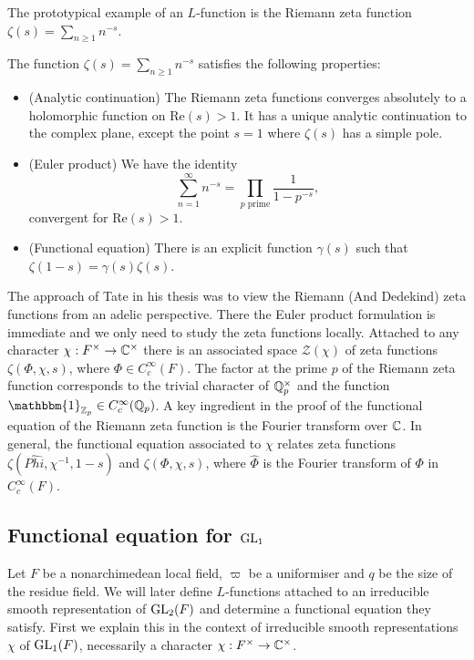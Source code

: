 The prototypical example of an $L$-function is the Riemann zeta function $\zeta(s) = \sum_{n \geq 1} n^{-s}$.

\begin{prop}
    The function $\zeta(s) = \sum_{n \geq 1} n^{-s}$ satisfies the following properties:
    \begin{itemize}
        \item (Analytic continuation) The Riemann zeta functions converges absolutely to a holomorphic function on $\mathrm{Re}(s)>1$. It has a unique analytic continuation to the complex plane, except the point $s=1$ where $\zeta(s)$ has a simple pole.
        \item (Euler product) We have the identity $$\sum\limits_{n=1}^\infty n^{-s} = \prod\limits_{p \text{ prime}} \frac{1}{1-p^{-s}},$$ convergent for $\mathrm{Re}(s)>1$.
        \item (Functional equation) There is an explicit function $\gamma(s)$ such that $\zeta(1-s)=\gamma(s)\zeta(s)$.
    \end{itemize}
\end{prop}

The approach of Tate in his thesis was to view the Riemann (And Dedekind) zeta functions from an adelic perspective. There the Euler product formulation is immediate and we only need to study the zeta functions locally. Attached to any character $\chi:F^\times \to \mathbb{C}^\times$ there is an associated space $\mathcal Z(\chi)$ of zeta functions $\zeta(\Phi,\chi,s)$, where $\Phi \in C_c^\infty(F)$. The factor at the prime $p$ of the Riemann zeta function corresponds to the trivial character of $\mathbb{Q}_p^\times$ and the function $\mathbbm{1}_{\ZZ_p} \in C_c^\infty(\QQ_p)$. A key ingredient in the proof of the functional equation of the Riemann zeta function is the Fourier transform over $\mathbb{C}$. In general, the functional equation associated to $\chi$ relates zeta functions $\zeta(\hat{Phi},\chi^{-1},1-s)$ and $\zeta(\Phi,\chi,s)$, where $\hat{\Phi}$ is the Fourier transform of $\Phi$ in $C_c^\infty(F)$. 







\subsection{Functional equation for \texorpdfstring{$\mathrm{GL}_1$}{TEXT}}

Let $F$ be a nonarchimedean local field, $\varpi$ be a uniformiser and $q$ be the size of the residue field. We will later define $L$-functions attached to an irreducible smooth representation of $\mathrm{GL}_2(F)$ and determine a functional equation they satisfy. First we explain this in the context of irreducible smooth representations $\chi$ of $\mathrm{GL}_1(F)$, necessarily a character $\chi: F^\times \to \mathbb{C}^\times$.

